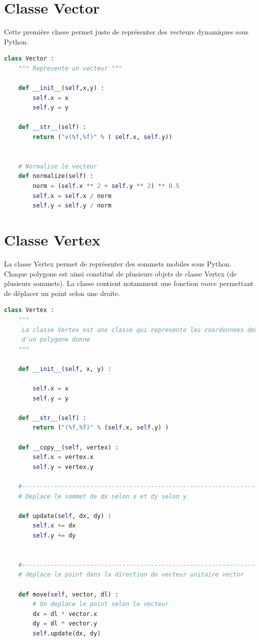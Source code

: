 \documentclass[a4paper,reqno]{article}
\begin{document}
\section*{Classe Vector}

Cette première classe permet juste de représenter des vecteurs dynamiques sous Python.


\begin{lstlisting}[language=Python,frame=single,caption=Création de la classe Vecteur]
class Vector : 
    """ Represente un vecteur """
    
    def __init__(self,x,y) : 
        self.x = x 
        self.y = y 
        
    def __str__(self) : 
        return ("v(%f,%f)" % ( self.x, self.y))
        
        
    # Normalise le vecteur 
    def normalize(self) : 
        norm = (self.x ** 2 + self.y ** 2) ** 0.5
        self.x = self.x / norm 
        self.y = self.y / norm 
\end{lstlisting}



\section*{Classe Vertex}

La classe Vertex permet de représenter des sommets mobiles sous Python. Chaque polygone est ainsi constitué de plusieurs objets de classe Vertex (de plusieurs sommets). La classe contient notamment une fonction $move$ permettant de déplacer un point selon une droite.

\begin{lstlisting}[language=Python,frame=single,caption=Création d'une classe Vertex]
class Vertex : 
    """
     La classe Vertex est une classe qui represente les coordonnees des points 
     d'un polygone donne 
    """
    
    def __init__(self, x, y) : 
        
        self.x = x 
        self.y = y 
    
    def __str__(self) : 
        return ("(%f,%f)" % (self.x, self.y) )
    
    def __copy__(self, vertex) : 
        self.x = vertex.x 
        self.y = vertex.y 
    
    #---------------------------------------------------------------------    
    # Deplace le sommet de dx selon x et dy selon y 
    
    def update(self, dx, dy) : 
        self.x += dx 
        self.y += dy 
        
        
    #---------------------------------------------------------------------   
    # deplace le point dans la direction du vecteur unitaire vector 
    
    def move(self, vector, dl) : 
        # On deplace le point selon le vecteur
        dx = dl * vector.x 
        dy = dl * vector.y 
        self.update(dx, dy) 
\end{lstlisting}
\end{document}
